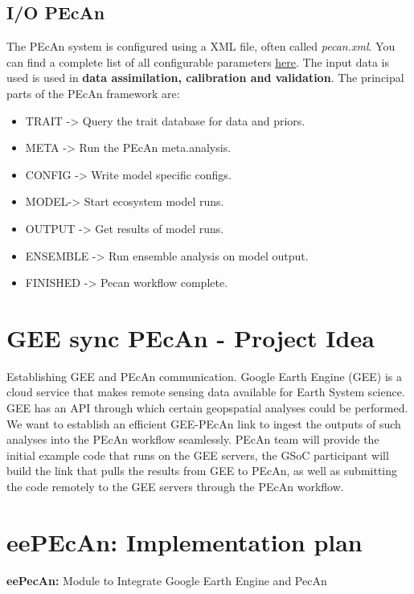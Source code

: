 \documentclass{eepecan}
\begin{document}
	\subsection{I/O PEcAn}
	The PEcAn system is configured using a XML file, often called \emph{pecan.xml}. You can find a complete list of all configurable parameters \href{https://pecanproject.github.io/pecan-documentation/master/pecanXML.html}{here}. The input data is used is used in \textbf{data assimilation, calibration and validation}. The principal parts of the PEcAn framework are:
	
	\begin{itemize}
	\item TRAIT -> Query the trait database for data and priors.
	\item META -> Run the PEcAn meta.analysis.
	\item CONFIG -> Write model specific configs.
	\item MODEL-> Start ecosystem model runs.
	\item OUTPUT ->	Get results of model runs.
	\item ENSEMBLE -> Run ensemble analysis on model output. 
	\item FINISHED -> Pecan workflow complete.
	\end{itemize}
	
	\section{GEE sync PEcAn - Project Idea}
	
	Establishing GEE and PEcAn communication. Google Earth Engine (GEE) is a cloud service that makes remote sensing data available for Earth System science. GEE has an API through which certain geopspatial analyses could be performed. We want to establish an efficient GEE-PEcAn link to ingest the outputs of such analyses into the PEcAn workflow seamlessly. PEcAn team will provide the initial example code that runs on the GEE servers, the GSoC participant will build the link that pulls the results from GEE to PEcAn, as well as submitting the code remotely to the GEE servers through the PEcAn workflow.
	
	\section{eePEcAn: Implementation plan}
	
	\textbf{eePecAn:} Module to Integrate Google Earth Engine and PecAn
	
\end{document}

